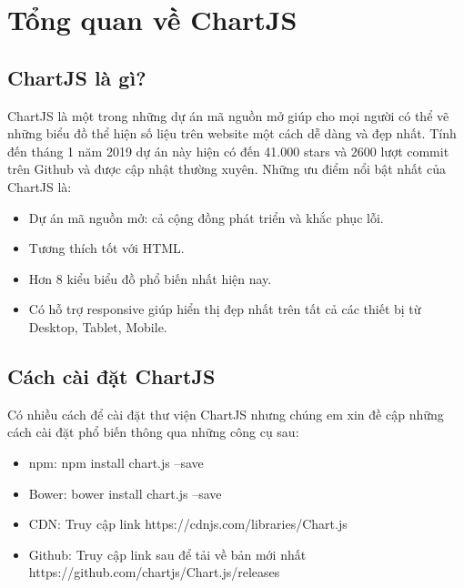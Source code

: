\section{Tổng quan về ChartJS}
\subsection{ChartJS là gì? \cite{chartjs:1}}
ChartJS là một trong những dự án mã nguồn mở giúp cho mọi người có thể vẽ những biểu đồ thể hiện số liệu trên website một cách dễ dàng và đẹp nhất. Tính đến tháng 1 năm 2019 dự án này hiện có đến 41.000 stars và 2600 lượt commit trên Github và được cập nhật thường xuyên. Những ưu điểm nổi bật nhất của ChartJS là:
\begin{itemize}
	\item Dự án mã nguồn mở: cả cộng đồng phát triển và khắc phục lỗi.
	\item Tương thích tốt với HTML.
	\item Hơn 8 kiểu biểu đồ phổ biến nhất hiện nay.
	\item Có hỗ trợ responsive giúp hiển thị đẹp nhất trên tất cả các thiết bị từ Desktop, Tablet, Mobile.
\end{itemize}

\subsection{Cách cài đặt ChartJS \cite{chartjs:2}}
Có nhiều cách để cài đặt thư viện ChartJS nhưng chúng em xin đề cập những cách cài đặt phổ biến thông qua những công cụ sau:
\begin{itemize}
	\item npm: npm install chart.js --save
	\item Bower: bower install chart.js --save
	\item CDN: Truy cập link https://cdnjs.com/libraries/Chart.js
	\item Github: Truy cập link sau để tải về bản mới nhất https://github.com/chartjs/Chart.js/releases
\end{itemize}

